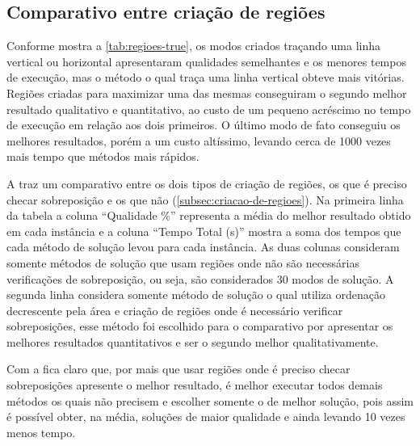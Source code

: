 \subsection{Comparativo entre criação de regiões}\label{subsec:comparativo-entre-criacao-de-regioes}

Conforme mostra a \autoref{tab:regioes-true}, os modos criados traçando uma linha vertical ou
horizontal apresentaram qualidades semelhantes e
os menores tempos de execução, mas o método o qual traça uma linha vertical obteve mais vitórias.
Regiões criadas para maximizar uma das mesmas conseguiram o segundo melhor resultado qualitativo e
quantitativo, ao custo de um pequeno acréscimo no tempo de execução em relação aos dois primeiros.
O último modo de fato conseguiu os melhores resultados, porém a um custo altíssimo, levando cerca
de 1000 vezes mais tempo que métodos mais rápidos.



A  traz um comparativo entre os dois tipos de criação de regiões,
os que é preciso checar sobreposição e os que não (\cref{subsec:criacao-de-regioes}).
Na primeira linha da tabela a coluna “Qualidade \%” representa a média do melhor resultado obtido
em cada instância e a coluna “Tempo Total (s)” mostra a soma dos tempos que cada método de solução
levou para cada instância.
As duas colunas consideram somente métodos de solução que usam regiões onde não são necessárias
verificações de sobreposição, ou seja, são considerados 30 modos de solução.
A segunda linha considera somente método de solução o qual utiliza ordenação decrescente pela área
e criação de regiões onde é necessário verificar sobreposições, esse método foi escolhido para o
comparativo por apresentar os melhores resultados quantitativos e ser o segundo melhor
qualitativamente.



Com a  fica claro que, por mais que usar regiões onde é preciso checar
sobreposições apresente o melhor resultado, é melhor executar todos demais métodos os quais não
precisem e escolher somente o de melhor solução, pois assim é possível obter, na média, soluções
de maior qualidade e ainda levando 10 vezes menos tempo.